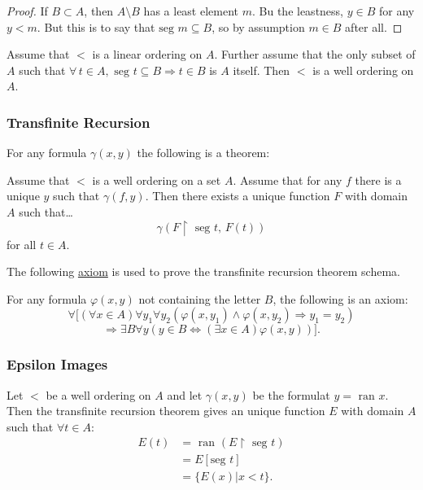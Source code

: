 \begin{proof}
If $B \subset A$, then $A \setminus B$ has a least element $m$. Bu the leastness, $y \in B$ for any $y < m$. But this is to say that $\textrm{seg } m \subseteq B$, so by assumption $m \in B$ after all.
\end{proof}

\begin{proposition}
Assume that $<$ is a linear ordering on $A$. Further assume that the only subset of $A$ such that $\forall \, t \in A, \textrm{ seg } t \subseteq B \Rightarrow t \in B$ is $A$ itself. Then $<$ is a well ordering on $A$.
\end{proposition}

\subsubsection{Transfinite Recursion}\label{transfiniterecursion}

\begin{theorem}
For any formula $\gamma (x,y)$ the following is a theorem:

Assume that $<$ is a well ordering on a set $A$. Assume that for any $f$ there is a unique $y$ such that $\gamma (f,y).$ Then there exists a unique 
function $F$ with domain $A$ such that\dots
$$\gamma (F \upharpoonright \textrm{ seg } t, \, F(t))$$
for all $t \in A$.
\end{theorem}

\noindent The following \hyperref[setaxioms]{axiom} is used to prove the transfinite recursion theorem schema.\newline

\noindent For any formula $\varphi (x,y)$ not containing the letter $B$, the following is an axiom:
$$\forall [(\forall x \in A) \forall y_1 \forall y_2 (\varphi (x,y_1) \land \varphi (x, y_2) \Rightarrow y_1 = y_2)$$
$$\Rightarrow \exists B \forall y (y \in B \Leftrightarrow (\exists x \in A) \varphi (x,y))].$$

\subsubsection{Epsilon Images}\label{epsilonimages}

Let $<$ be a well ordering on $A$ and let $\gamma (x,y)$ be the formulat $y = \textrm{ ran } x$. Then the transfinite recursion theorem gives an unique function $E$ with domain $A$ such that $\forall t \in A$:
\begin{align*}
E(t) &= \textrm{ ran }(E \upharpoonright \textrm{ seg } t)\\
	 &= E[\textrm{seg } t]\\
	 &= \{ E(x) | x < t \}.
\end{align*}

